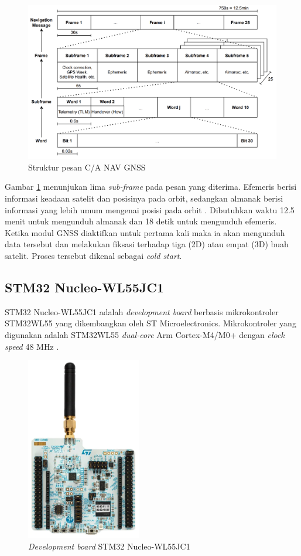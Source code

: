 \begin{figure}[ht]
	\centering
	\includegraphics[width=13cm]{contents/chapter-2/gnss_msg_structure.png}
	\caption{Struktur pesan C/A NAV GNSS}
	\label{Fig: gnss_message_structure}
\end{figure}

Gambar \ref{Fig: gnss_message_structure} menunjukan lima \textit{sub-frame} pada pesan yang diterima. Efemeris berisi informasi keadaan satelit dan posisinya pada orbit, sedangkan almanak berisi informasi yang lebih umum mengenai posisi pada orbit \cite{Lenhart2022}. Dibutuhkan waktu 12.5 menit untuk mengunduh almanak dan 18 detik untuk mengunduh efemeris. Ketika modul GNSS diaktifkan untuk pertama kali maka ia akan mengunduh data tersebut dan melakukan fiksasi terhadap tiga (2D) atau empat (3D) buah satelit. Proses tersebut dikenal sebagai \textit{cold start}.

\subsection{STM32 Nucleo-WL55JC1}
STM32 Nucleo-WL55JC1 adalah \textit{development board} berbasis mikrokontroler STM32WL55 yang  dikembangkan oleh ST Microelectronics. Mikrokontroler yang digunakan adalah STM32WL55  \textit{dual-core }Arm Cortex-M4/M0+ dengan \textit{clock speed} 48 MHz \cite{STMicroelectronics2022a}.

\begin{figure}[ht]
	\centering
	\includegraphics[width=5cm]{contents/chapter-2/stm32-wl55jc1.jpg}
	\caption{\textit{Development board} STM32 Nucleo-WL55JC1}
	\label{Fig: STM32 Nucleo-WL55JC1}
\end{figure}


